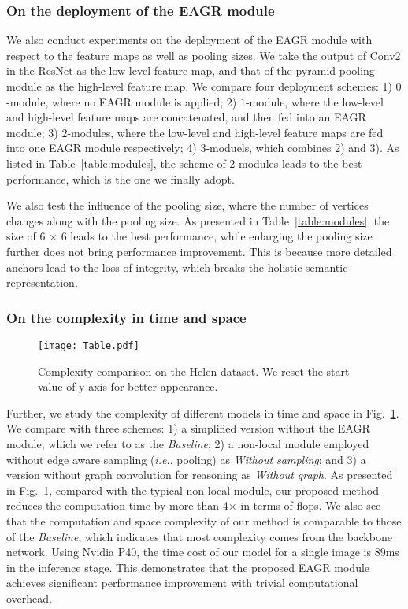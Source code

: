 \documentclass[runningheads]{llncs}
\def\ie{{\it i.e.}}
\begin{document}
\subsubsection{On the deployment of the EAGR module}

We also conduct experiments on the deployment of the EAGR module with respect to the feature maps as well as pooling sizes. 
We take the output of Conv2 in the ResNet as the low-level feature map, and that of the pyramid pooling module as the high-level feature map.  
We compare four deployment schemes: 1) $0$-module, where no EAGR module is applied; 
2) $1$-module, where the low-level and high-level feature maps are concatenated, and then fed into an EAGR module;
3) $2$-modules, where the low-level and high-level feature maps are fed into one EAGR module respectively;
4) $3$-moduels, which combines 2) and 3).   
As listed in Table~\ref{table:modules}, the scheme of $2$-modules leads to the best performance, which is the one we finally adopt. 

We also test the influence of the pooling size, where the number of vertices changes along with the pooling size. 
As presented in Table~\ref{table:modules}, the size of 6 $\times$ 6 leads to the best performance, while enlarging the pooling size further does not bring performance improvement. 
This is because more detailed anchors lead to the loss of integrity, which breaks the holistic semantic representation.

\subsubsection{On the complexity in time and space}
\begin{figure}[t]
    \centering
    \texttt{[image: Table.pdf]}
    \caption{Complexity comparison on the Helen dataset. We reset the start value of y-axis for better appearance.}
    \label{fig:table}
\end{figure}

Further, we study the complexity of different models in time and space in Fig.~\ref{fig:table}. We compare with three schemes: 
1) a simplified version without the EAGR module, which we refer to as the \textit{Baseline}; 
2) a non-local module \cite{wang2018non} employed without edge aware sampling (\ie, pooling) as \textit{Without sampling}; and 
3) a version without graph convolution for reasoning as \textit{Without graph}. 
As presented in Fig.~\ref{fig:table}, compared with the typical non-local module, our proposed method reduces the computation time by more than 4$\times$ in terms of flops. 
We also see that the computation and space complexity of our method is comparable to those of the \textit{Baseline}, which indicates that most complexity comes from the backbone network.  Using Nvidia P40, the time cost of our model for a single image is $89$ms in the inference stage. 
This demonstrates that the proposed EAGR module achieves significant performance improvement with trivial computational overhead. 
\end{document}
